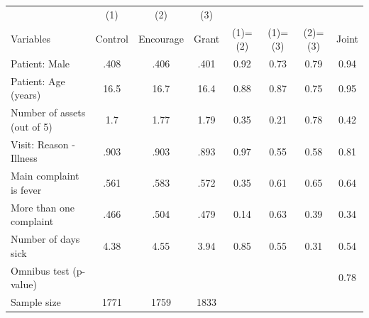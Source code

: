 \small\begin{tabular}{lccccccc} 
\toprule 
                       &    (1)        &   (2)         &   (3)         &                       &                       &                       &  \\
Variables      & Control       & Encourage     & Grant         & (1)=(2)       & (1)=(3)       & (2)=(3)       & Joint\\
\midrule 
Patient: Male & .408 & .406  & .401 & 0.92 & 0.73 & 0.79 & 0.94\\
Patient: Age (years) & 16.5 & 16.7  & 16.4 & 0.88 & 0.87 & 0.75 & 0.95\\
Number of assets (out of 5) & 1.7 & 1.77  & 1.79 & 0.35 & 0.21 & 0.78 & 0.42\\
Visit: Reason - Illness  & .903 & .903  & .893 & 0.97 & 0.55 & 0.58 & 0.81\\
Main complaint is fever & .561 & .583  & .572 & 0.35 & 0.61 & 0.65 & 0.64\\
More than one complaint & .466 & .504  & .479 & 0.14 & 0.63 & 0.39 & 0.34\\
Number of days sick & 4.38 & 4.55  & 3.94 & 0.85 & 0.55 & 0.31 & 0.54\\
 Omnibus test (p-value) &   &   &  &  &  &  & 0.78  \\
\midrule 
 Sample size & 1771 & 1759  & 1833 &  &  &  &  \\
 \bottomrule 
\end{tabular} 
